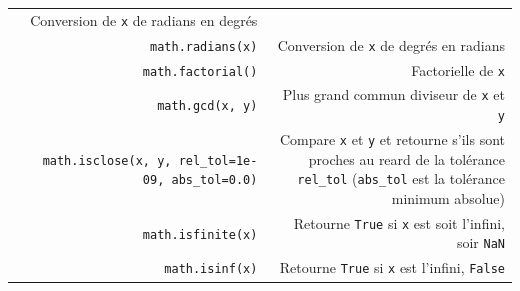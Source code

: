 \documentclass[12pt,]{book}
\numberwithin{equation}{section}
\numberwithin{countremarque}{section}
\begin{document}
\begin{longtable}[]{@{}rr@{}}
\begin{minipage}[t]{0.60\columnwidth}
Conversion de \texttt{x} de radians en degrés\strut
\end{minipage}\tabularnewline
\begin{minipage}[t]{0.21\columnwidth}\raggedleft\strut
\texttt{math.radians(x)}\strut
\end{minipage} & \begin{minipage}[t]{0.60\columnwidth}\raggedleft\strut
Conversion de \texttt{x} de degrés en radians\strut
\end{minipage}\tabularnewline
\begin{minipage}[t]{0.21\columnwidth}\raggedleft\strut
\texttt{math.factorial()}\strut
\end{minipage} & \begin{minipage}[t]{0.60\columnwidth}\raggedleft\strut
Factorielle de \texttt{x}\strut
\end{minipage}\tabularnewline
\begin{minipage}[t]{0.21\columnwidth}\raggedleft\strut
\texttt{math.gcd(x,\ y)}\strut
\end{minipage} & \begin{minipage}[t]{0.60\columnwidth}\raggedleft\strut
Plus grand commun diviseur de \texttt{x} et \texttt{y}\strut
\end{minipage}\tabularnewline
\begin{minipage}[t]{0.21\columnwidth}\raggedleft\strut
\texttt{math.isclose(x,\ y,\ rel\_tol=1e-09,\ abs\_tol=0.0)}\strut
\end{minipage} & \begin{minipage}[t]{0.60\columnwidth}\raggedleft\strut
Compare \texttt{x} et \texttt{y} et retourne s'ils sont proches au reard
de la tolérance \texttt{rel\_tol} (\texttt{abs\_tol} est la tolérance
minimum absolue)\strut
\end{minipage}\tabularnewline
\begin{minipage}[t]{0.21\columnwidth}\raggedleft\strut
\texttt{math.isfinite(x)}\strut
\end{minipage} & \begin{minipage}[t]{0.60\columnwidth}\raggedleft\strut
Retourne \texttt{True} si \texttt{x} est soit l'infini, soir
\texttt{NaN}\strut
\end{minipage}\tabularnewline
\begin{minipage}[t]{0.21\columnwidth}\raggedleft\strut
\texttt{math.isinf(x)}\strut
\end{minipage} & \begin{minipage}[t]{0.60\columnwidth}\raggedleft\strut
Retourne \texttt{True} si \texttt{x} est l'infini, \texttt{False}

\end{minipage}
\end{longtable}
\end{document}

